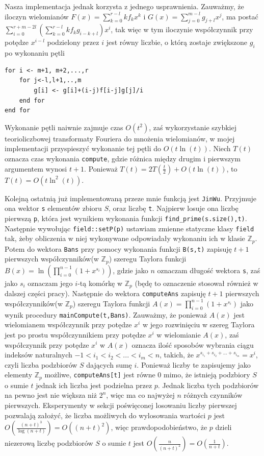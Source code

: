 \documentclass{article}
\begin{document}
Nasza implementacja jednak korzysta z jednego usprawnienia. Zauważmy, że iloczyn wielomianów $F(x)=\sum_{k=0}^{r-l}kf_kx^k$ i 
$G(x)=\sum_{j=0}^{m-l}g_{j+l}x^j$, ma postać 
$\sum_{i=0}^{r+m-2l}(\sum_{k=0}^{r-l}kf_kg_{i-k+l})x^i$, tak więc w tym iloczynie współczynnik przy potędze $x^{i-l}$ podzielony
przez $i$ jest równy liczbie, o którą zostaje zwiększone $g_i$ po wykonaniu pętli
\begin{verbatim}
for i <- m+1, m+2,...,r
    for j<-l,l+1,..,m
        g[i] <- g[i]+(i-j)f[i-j]g[j]/i
    end for
end for
\end{verbatim}

Wykonanie pętli naiwnie zajmuje czas $O(t^2)$, zaś wykorzystanie szybkiej teorioliczbowej transformaty Fouriera do mnożenia wielomianów,
w mojej implementacji przyspieszyć wykonanie tej pętli do $O(t\ln(t))$.
Niech $T(t)$ oznacza czas wykonania \texttt{compute}, gdzie różnica między drugim i pierwszym argumentem wynosi $t+1$.
Ponieważ $T(t)=2T(\frac{t}{2})+O(t\ln(t))$, to $T(t)=O(t \ln^2(t))$.

Kolejną ostatnią już implementowaną przeze mnie funkcją jest \texttt{JinWu}. Przyjmuje ona wektor \texttt{s} 
elementów zbioru 
$S$, oraz
liczbę \texttt{t}. Najpierw losuje ona liczbę pierwszą \texttt{p}, która jest wynikiem wykonania funkcji 
\texttt{find\_prime(s.size(),t)}. Następnie
wywołując \texttt{field::setP(p)} ustawiam zmienne statyczne klasy \texttt{field} tak, żeby obliczenia w niej wykonywane 
odpowiadały wykonaniu ich w klasie $\mathbb{Z}_p$. Potem do wektora \texttt{Bans} przy pomocy wykonania funkcji 
\texttt{B(s,t)} zapisuję
$t+1$ pierwszych współczynników(w $\mathbb{Z}_p$) szeregu Taylora funkcji $B(x)=\ln(\prod_{i=0}^{n-1}(1+x^{s_i}))$, gdzie jako $n$ oznaczam długość
wektora \texttt{s}, zaś jako $s_i$ oznaczam jego $i$-tą komórkę w $\mathbb{Z}_p$ (będę to oznaczenie stosował również w dalszej części pracy). 
Następnie do wektora \texttt{computeAns} zapisuję $t+1$ pierwszych współczynników(w $\mathbb{Z}_p$) szeregu Taylora funkcji 
$A(x)=\prod_{i=0}^{n-1}(1+x^{s_i})$ jako wynik procedury \texttt{mainCompute(t,Bans)}. 
Zauważmy, że ponieważ $A(x)$ jest wielomianem współczynnik
przy potędze $x^i$ w jego rozwinięciu w szereg Taylora jest po prostu współczynnikiem przy potędze $x^i$ w wielomianie $A(x)$, zaś współczynnik przy potędze $x^i$ w $A(x)$ oznacza ilość sposobów wybrania ciągu indeksów naturalnych $-1<i_1<i_2<...<i_m<n$, 
takich, że
$x^{s_{i_1}+s_{i_2}+...+s_{i_m}}=x^i$, czyli liczba podzbiorów $S$ dających sumę $i$. Ponieważ liczby te zapisujemy jako elementy 
$\mathbb{Z}_p$ możliwe, \texttt{computeAns[t]} jest równe $0$ mimo, że istnieją podzbiory $S$ o sumie $t$ jednak ich liczba jest podzielna
przez $p$. Jednak liczba tych podzbiorów na pewno jest nie większa niż $2^n$, więc ma co najwyżej $n$ różnych czynników pierwszych.
Eksperymenty w sekcji poświęconej losowaniu liczby pierwszej pozwalają założyć, że liczba możliwych do wylosowania wartości $p$
jest $O(\frac{(n+t)^3}{\log(n+t)})=O((n+t)^2)$, więc prawdopodobieństwo, że $p$ dzieli niezerową liczbę podzbiorów $S$ o sumie $t$
jest $O(\frac{n}{(n+t)^2})=O(\frac{1}{n+t})$.
\end{document}
